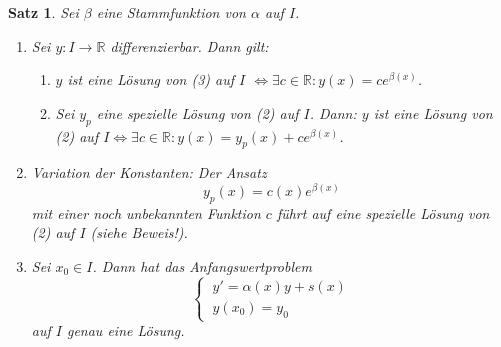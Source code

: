 \documentclass[12pt]{extreport} %
\newcommand{\R}{\mathbb{R}}
\theoremstyle{named}
\theoremstyle{nnamed}
\theoremstyle{itshape}
\newtheorem{satz}[unnamedtheorem]{Satz}
\theoremstyle{normal}
\begin{document}
\begin{satz} \label{21.2:satz}
	Sei $\beta$ eine Stammfunktion von $\alpha$ auf $I$.
	\begin{enumerate}
		\item Sei $y \colon I \rightarrow \R$ differenzierbar. Dann gilt:
			\begin{enumerate}
				\item $y$ ist eine Lösung von (3) auf $I$ $\iff \exists c \in \R : y(x) = c e^{\beta(x)}$.
				\item Sei $y_{p}$ eine spezielle Lösung von (2) auf $I$. Dann: $y$ ist eine Lösung von (2) auf $I \iff \exists c \in \R : y(x) = y_{p}(x) + c e^{\beta(x)}$.
			\end{enumerate}
		\item Variation der Konstanten: Der Ansatz
			$$ y_{p}(x) = c(x) e^{\beta(x)} $$
			mit einer noch unbekannten Funktion $c$ führt auf eine spezielle Lösung von (2) auf $I$ (siehe Beweis!).
		\item Sei $x_{0} \in I$. Dann hat das Anfangswertproblem
			$$ \begin{cases} ~y' = \alpha(x) y + s(x) \\ ~y(x_{0}) = y_{0} \end{cases} $$
			auf $I$ genau eine Lösung.
	\end{enumerate}
	

\end{satz}
\end{document}
